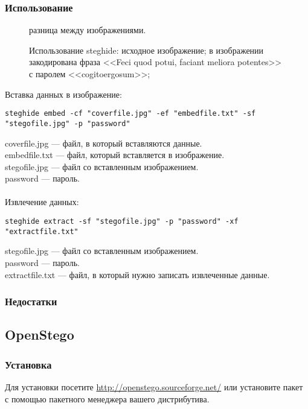 \subsubsection{Использование}
\begin{figure}[ht!]
\vspace{-4ex}
\centering
{}
\hspace{4ex}
\hspace{4ex}
\caption{Использование steghide: 
 исходное изображение; 
 в изображении закодирована фраза <<Feci quod potui, faciant meliora potentes>> с паролем <<cogitoergosum>>; 
} разница между изображениями.
\end{figure}
Вставка данных в изображение:
\begin{lstlisting}
steghide embed -cf "coverfile.jpg" -ef "embedfile.txt" -sf "stegofile.jpg" -p "password"
\end{lstlisting}
coverfile.jpg --- файл, в который вставляются данные.\\
embedfile.txt --- файл, который вставляется в изображение.\\
stegofile.jpg --- файл со вставленным изображением.\\
password --- пароль.\\\\
Извлечение данных:
\begin{lstlisting}
steghide extract -sf "stegofile.jpg" -p "password" -xf "extractfile.txt"
\end{lstlisting}
stegofile.jpg --- файл со вставленным изображением.\\
password --- пароль.\\
extractfile.txt --- файл, в который нужно записать извлеченные данные.
\subsubsection{Недостатки}
\newpage %
\subsection{OpenStego}
\subsubsection{Установка}
Для установки посетите \url{http://openstego.sourceforge.net/} или установите пакет с помощью пакетного менеджера вашего дистрибутива.
